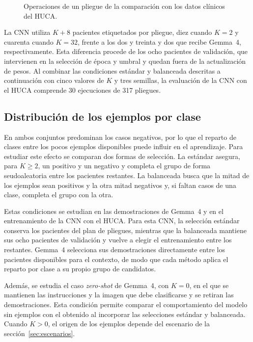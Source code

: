 \begin{figure}[H]
  \centering
  \caption{Operaciones de un pliegue de la comparación con los datos clínicos del HUCA.}
  \label{fig:clinical_fold_protocol}
\end{figure}

La CNN utiliza \(K+8\) pacientes etiquetados por pliegue, diez cuando \(K=2\) y cuarenta cuando \(K=32\), frente a los dos y treinta y dos que recibe Gemma~4, respectivamente. Esta diferencia procede de los ocho pacientes de validación, que intervienen en la selección de época y umbral y quedan fuera de la actualización de pesos. Al combinar las condiciones estándar y balanceada descritas a continuación con cinco valores de \(K\) y tres semillas, la evaluación de la CNN con el HUCA comprende 30 ejecuciones de 317 pliegues.

\subsection{Distribución de los ejemplos por clase}
\label{sec:condiciones_vlm}
\label{sec:origen_contexto_vlm}

En ambos conjuntos predominan los casos negativos, por lo que el reparto de clases entre los pocos ejemplos disponibles puede influir en el aprendizaje. Para estudiar este efecto se comparan dos formas de selección. La estándar asegura, para \(K\geq2\), un positivo y un negativo y completa el grupo de forma seudoaleatoria entre los pacientes restantes. La balanceada busca que la mitad de los ejemplos sean positivos y la otra mitad negativos y, si faltan casos de una clase, completa el grupo con la otra.

\begin{samepage}
Estas condiciones se estudian en las demostraciones de Gemma~4 y en el entrenamiento de la CNN con el HUCA. Para esta CNN, la selección estándar conserva los pacientes del plan de pliegues, mientras que la balanceada mantiene sus ocho pacientes de validación y vuelve a elegir el entrenamiento entre los restantes. Gemma~4 selecciona sus demostraciones directamente entre los pacientes disponibles para el contexto, de modo que cada método aplica el reparto por clase a su propio grupo de candidatos.
\par
\end{samepage}

Además, se estudia el caso \emph{zero-shot} de Gemma~4, con \(K=0\), en el que se mantienen las instrucciones y la imagen que debe clasificarse y se retiran las demostraciones. Esta condición permite comparar el comportamiento del modelo sin ejemplos con el obtenido al incorporar las selecciones estándar y balanceada. Cuando \(K>0\), el origen de los ejemplos depende del escenario de la sección~\ref{sec:escenarios}.

